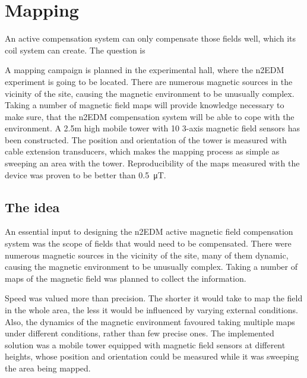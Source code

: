 \chapter{Mapping}
An active compensation system can only compensate those fields well, which its coil system can create. The question is


A mapping campaign is planned in the experimental hall, where the n2EDM experiment is going to be located. There are numerous magnetic sources in the vicinity of the site, causing the magnetic environment to be unusually complex. Taking a number of magnetic field maps will provide knowledge necessary to make sure, that the n2EDM compensation system will be able to cope with the environment. A 2.5m high mobile tower with 10 3-axis magnetic field sensors has been constructed. The position and orientation of the tower is measured with cable extension transducers, which makes the mapping process as simple as sweeping an area with the tower. Reproducibility of the maps measured with the device was proven to be better than \SI{0.5}{\micro\tesla}.




\section{The idea}
An essential input to designing the n2EDM active magnetic field compensation system was the scope of fields that would need to be compensated. There were numerous magnetic sources in the vicinity of the  site, many of them dynamic, causing the magnetic environment to be unusually complex. Taking a number of maps of the magnetic field was planned to collect the information.

Speed was valued more than precision. The shorter it would take to map the field in the whole area, the less it would be influenced by varying external conditions. Also, the dynamics of the magnetic environment favoured taking multiple maps under different conditions, rather than few precise ones.
The implemented solution was a mobile tower equipped with magnetic field sensors at different heights, whose position and orientation could be measured while it was sweeping the area being mapped.

